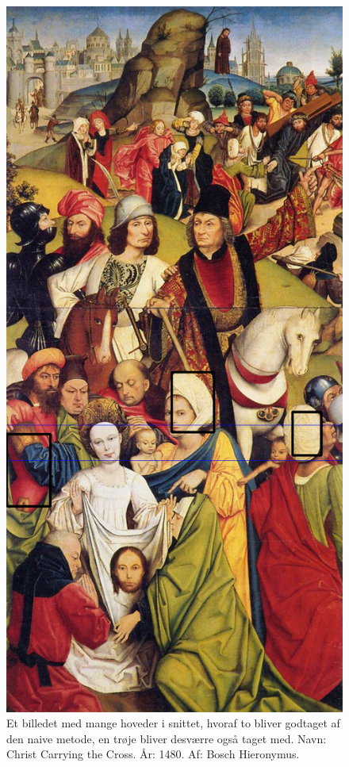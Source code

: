 \begin{figure}[h!!]
	\begin{center}
		\includegraphics[scale=0.3,angle=0]{afsnit/afprovning/billeder/naive_losning/naiv_kfarver_kdetaljer.png}
	\end{center}
	\caption[]{Et billedet med mange hoveder i snittet, hvoraf to
	bliver godtaget af den naive metode, en
	trøje bliver desværre også taget med. Navn: Christ Carrying the
	Cross. År: 1480. Af: Bosch Hieronymus.}
	\label{naiv_kfarver_kdetaljer}
\end{figure}

